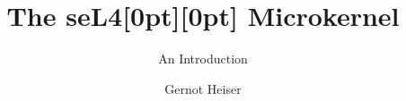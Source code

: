 \documentclass[english,a4paper,12pt\ifDraft,draft\fi]{report}
\begin{document}
  \renewcommand{\chapterautorefname}{Chapter}
  \renewcommand{\sectionautorefname}{Section}
  \renewcommand{\subsectionautorefname}{Section}
  \renewcommand{\subsubsectionautorefname}{Section}
  \renewcommand{\appendixautorefname}{Appendix}
  \renewcommand{\Hfootnoteautorefname}{Footnote}
  \newcommand{\Htextbf}[1]{\textbf{\hyperpage{#1}}}

  \renewcommand{\topfraction}{0.9}
  \renewcommand{\bottomfraction}{0.9}

  \title{The seL4\raisebox{1ex}[0pt][0pt]{\large\textregistered} Microkernel}
  \subtitle{An Introduction}

  \author{Gernot Heiser}
  \date{}

  \thispagestyle{plain}
  \maketitle 
  \doCopyright[2020]
\end{document}
